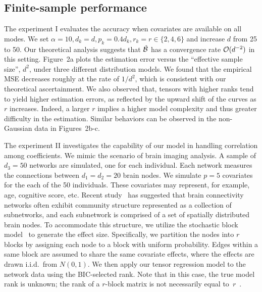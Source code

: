 \documentclass{article}
\theoremstyle{plain}
\theoremstyle{definition}
\begin{document}
\subsection{Finite-sample performance}

The experiment I evaluates the accuracy when covariates are available on all modes. We set $\alpha=10, d_k=d, p_k=0.4d_k, r_k=r\in\{2,4,6\}$ and increase $d$ from 25 to 50. Our theoretical analysis suggests that $\hat {\mathcal{B}}$ has a convergence rate $\mathcal{O}(d^{-2})$ in this setting. Figure~2a plots the estimation error versus the ``effective sample size'', $d^2$, under three different distribution models. We found that the empirical MSE decreases roughly at the rate of $1/d^2$, which is consistent with our theoretical ascertainment. We also observed that, tensors with higher ranks tend to yield higher estimation errors, as reflected by the upward shift of the curves as $r$ increases. Indeed, a larger $r$ implies a higher model complexity and thus greater difficulty in the estimation. Similar behaviors can be observed in the non-Gaussian data in Figures~2b-c. 

The experiment II investigates the capability of our model in handling correlation among coefficients. We mimic the scenario of brain imaging analysis. A sample of $d_3=50$ networks are simulated, one for each individual. Each network measures the connections between $d_1=d_2=20$ brain nodes. We simulate $p=5$ covariates for the each of the 50 individuals. These covariates may represent, for example, age, cognitive score, etc. Recent study~\cite{robinson2015dynamic} has suggested that brain connectivity networks often exhibit community structure represented as a collection of subnetworks, and each subnetwork is comprised of a set of spatially distributed brain nodes. To accommodate this structure, we utilize the stochastic block model~\cite{abbe2017community} to generate the effect size. Specifically, we partition the nodes into $r$ blocks by assigning each node to a block with uniform probability. Edges within a same block are assumed to share the same covariate effects, where the effects are drawn i.i.d.\ from $N(0,1)$. We then apply our tensor regression model to the network data using the BIC-selected rank. Note that in this case, the true model rank is unknown; the rank of a $r$-block matrix is not necessarily equal to~$r$~\cite{zeng2019multiway}. 
\end{document}
